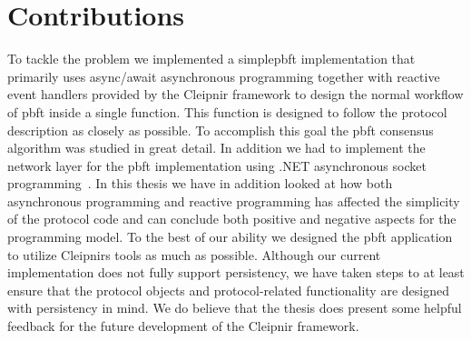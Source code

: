 \section{Contributions}

\iffalse 
To tackle the problem we implemented a simple\ac{pbft} implementation that primarily uses async/await asynchronous programming together with reactive event handlers provided by the Cleipnir framework to design the normal workflow of \ac{pbft} inside a single function. This function is designed to follow the protocol description as closely as possible. To accomplish this goal the \ac{pbft} consensus algorithm was studied in great detail. In addition we had to implement the network layer for the \ac{pbft} implementation using .NET asynchronous socket programming~\cite{DOC:AsyncSocketProg, VIDEO:dotnetsocketprog}. In this thesis we have in addition looked at how both asynchronous programming and reactive programming has affected the simplicity of the protocol code and can conclude both positive and negative aspects for the programming model. To the best of our ability we designed the \ac{pbft} application to utilize Cleipnirs tools as much as possible. Although our current implementation does not fully support persistency, we have taken steps to at least ensure that the protocol objects and protocol-related functionality are designed with persistency in mind. We do believe that the thesis does present some helpful feedback for the future development of the Cleipnir framework.

